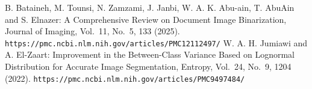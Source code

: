  B. Bataineh, M. Tounsi, N. Zamzami, J. Janbi, W. A. K. Abu-ain, T. AbuAin and S. Elnazer: A Comprehensive Review on Document Image Binarization, Journal of Imaging, Vol.~11, No.~5, 133 (2025). {\tt https://pmc.ncbi.nlm.nih.gov/articles/PMC12112497/}
 W. A. H. Jumiawi and A. El-Zaart: Improvement in the Between-Class Variance Based on Lognormal Distribution for Accurate Image Segmentation, Entropy, Vol.~24, No.~9, 1204 (2022). {\tt https://pmc.ncbi.nlm.nih.gov/articles/PMC9497484/}
